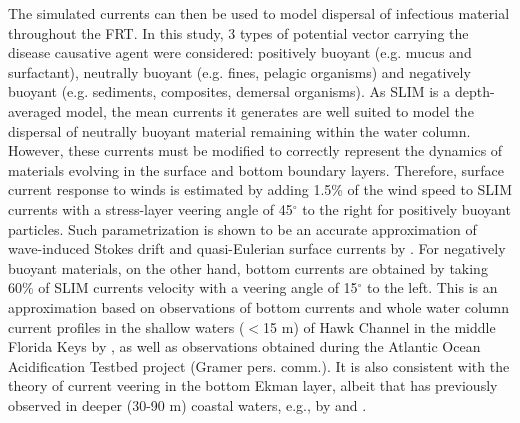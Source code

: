 \documentclass[utf8]{frontiersSCNS}
\begin{document}
The simulated currents can then be used to model dispersal of infectious material throughout the FRT. In this study, 3 types of potential vector carrying the disease causative agent were considered: positively buoyant (e.g. mucus and surfactant), neutrally buoyant (e.g. fines, pelagic organisms) and negatively buoyant (e.g. sediments, composites, demersal organisms). As SLIM is a depth-averaged model, the mean currents it generates are well suited to model the dispersal of neutrally buoyant material remaining within the water column. However, these currents must be modified to correctly represent the dynamics of materials evolving in the surface and bottom boundary layers. Therefore, surface current response to winds is estimated by adding 1.5\% of the wind speed to SLIM currents with a stress-layer veering angle of 45$^\circ$ to the right for positively buoyant particles. Such parametrization is shown to be an accurate approximation of wave-induced Stokes drift and quasi-Eulerian surface currents by \citep{ardhuin2009observation}. For negatively buoyant materials, on the other hand, bottom currents are obtained by taking 60\% of SLIM currents velocity with a veering angle of 15$^\circ$ to the left. This is an approximation based on observations of bottom currents and whole water column current profiles in the shallow waters ($<$15 m) of Hawk Channel in the middle Florida Keys by \cite{smith2009influence}, as well as observations obtained during the Atlantic Ocean Acidification Testbed project (Gramer pers. comm.). It is also consistent with the theory of current veering in the bottom Ekman layer, albeit that has previously observed in deeper (30-90 m) coastal waters, e.g., by \cite{perlin2007organization} and \cite{kundu1976ekman}.
\end{document}
